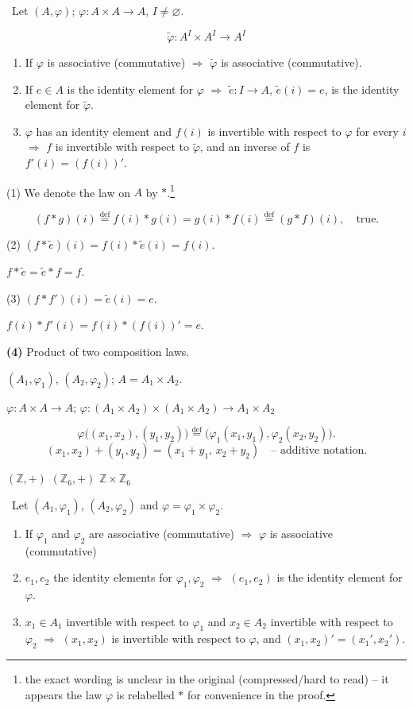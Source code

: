 \documentclass[12pt]{article}
\begin{document}
\noindent{} \ Let $(A,\varphi)$; $\varphi : A\times A \to A$, $I\neq\varnothing$.

\[
\tilde\varphi : A^I \times A^I \to A^I
\]

\begin{enumerate}
\item[(1)] If $\varphi$ is associative (commutative) $\Rightarrow$ $\tilde\varphi$ is associative (commutative).
\item[(2)] If $e\in A$ is the identity element for $\varphi$ $\Rightarrow$ $\tilde e : I\to A$, $\tilde e(i)=e$, is the identity element for $\tilde\varphi$.
\item[(3)] $\varphi$ has an identity element and $f(i)$ is invertible with respect to $\varphi$ for every $i$ $\Rightarrow$ $f$ is invertible with respect to $\tilde\varphi$, and an inverse of $f$ is $f'(i) = (f(i))'$.
\end{enumerate}

\bigskip
\noindent (1) We denote the law on $A$ by $*$.\footnote{the exact wording is unclear in the original (compressed/hard to read) -- it appears the law $\varphi$ is relabelled $*$ for convenience in the proof.}

\[
(f*g)(i) \overset{\text{def}}{=} f(i)*g(i) = g(i)*f(i) \overset{\text{def}}{=} (g*f)(i), \quad \text{true.}
\]

\noindent (2) $(f*\tilde e)(i) = f(i)*\tilde e(i) = f(i)$.

\noindent $f*\tilde e = \tilde e*f = f$.

\noindent (3) $(f*f')(i) = \tilde e(i) = e$.

\noindent $f(i)*f'(i) = f(i)*(f(i))' = e$.

\bigskip
\noindent\textbf{(4)} Product of two composition laws.

\noindent $(A_1,\varphi_1)$, $(A_2,\varphi_2)$; $A = A_1\times A_2$.

\noindent $\varphi : A\times A \to A$; \quad $\varphi : (A_1\times A_2)\times(A_1\times A_2) \to A_1\times A_2$

\[
\varphi\big((x_1,x_2),(y_1,y_2)\big) \overset{\text{def}}{=} \big(\varphi_1(x_1,y_1),\varphi_2(x_2,y_2)\big).
\]
\[
(x_1,x_2)+(y_1,y_2) = (x_1+y_1,\,x_2+y_2) \quad \text{-- additive notation.}
\]

\noindent $(\mathbb{Z},+)$ \qquad $(\mathbb{Z}_6,+)$ \qquad $\mathbb{Z}\times\mathbb{Z}_6$

\bigskip
\noindent{} \ Let $(A_1,\varphi_1)$, $(A_2,\varphi_2)$ and $\varphi = \varphi_1\times\varphi_2$.

\begin{enumerate}
\item[(1)] If $\varphi_1$ and $\varphi_2$ are associative (commutative) $\Rightarrow$ $\varphi$ is associative (commutative)
\item[(2)] $e_1,e_2$ the identity elements for $\varphi_1,\varphi_2$ $\Rightarrow$ $(e_1,e_2)$ is the identity element for $\varphi$.
\item[(3)] $x_1\in A_1$ invertible with respect to $\varphi_1$ and $x_2\in A_2$ invertible with respect to $\varphi_2$ $\Rightarrow$ $(x_1,x_2)$ is invertible with respect to $\varphi$, and $(x_1,x_2)' = (x_1',x_2')$.
\end{enumerate}
\end{document}

